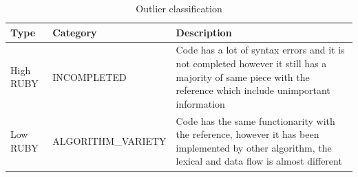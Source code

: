 \begin{table}[]
	\centering
	\caption{Outlier classification}
	\label{table:outliers_result}
	\begin{tabular}{|m{1cm}|m{3cm}|m{4cm}}
		\hline
		Type      & Category         & Description                                                                                                                    
		\\
		\hline
		High RUBY &     INCOMPLETED       &  Code has a lot of syntax errors and it is not completed however it still has a majority of same piece with the reference which include unimportant information \\                                   
		\hline
		Low RUBY  & ALGORITHM\_VARIETY        & Code has the same functionarity with the reference, however it has been implemented by other algorithm, the lexical and data flow is almost different           \\
		\hline                                                                                   
	\end{tabular}
\end{table}